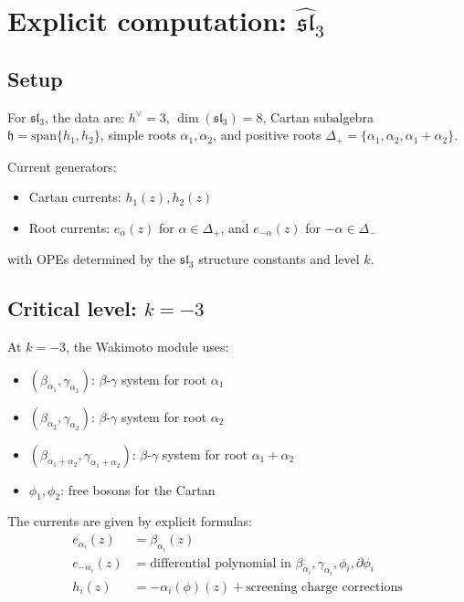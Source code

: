 \section{\texorpdfstring{Explicit computation: $\widehat{\mathfrak{sl}}_3$}{Explicit computation: sl-3}}
\label{sec:sl3-computation}

\subsection{Setup}

For $\mathfrak{sl}_3$, the data are: $h^\vee = 3$, $\dim(\mathfrak{sl}_3) = 8$, Cartan subalgebra $\mathfrak{h} = \mathrm{span}\{h_1, h_2\}$, simple roots $\alpha_1, \alpha_2$, and positive roots $\Delta_+ = \{\alpha_1, \alpha_2, \alpha_1+\alpha_2\}$.

\begin{definition}
Current generators:
\begin{itemize}
\item Cartan currents: $h_1(z), h_2(z)$
\item Root currents: $e_{\alpha}(z)$ for $\alpha \in \Delta_+$, and $e_{-\alpha}(z)$ for $-\alpha \in \Delta_-$
\end{itemize}
with OPEs determined by the $\mathfrak{sl}_3$ structure constants and level $k$.
\end{definition}

\subsection{\texorpdfstring{Critical level: $k = -3$}{Critical level: k = -3}}

\begin{theorem}\label{thm:w3-wakimoto-sl3}
At $k = -3$, the Wakimoto module uses:
\begin{itemize}
\item $(\beta_{\alpha_1}, \gamma_{\alpha_1})$: $\beta$-$\gamma$ system for root $\alpha_1$
\item $(\beta_{\alpha_2}, \gamma_{\alpha_2})$: $\beta$-$\gamma$ system for root $\alpha_2$
\item $(\beta_{\alpha_1+\alpha_2}, \gamma_{\alpha_1+\alpha_2})$: $\beta$-$\gamma$ system for root $\alpha_1+\alpha_2$
\item $\phi_1, \phi_2$: free bosons for the Cartan
\end{itemize}

The currents are given by explicit formulas:
\begin{align}
e_{\alpha_i}(z) &= \beta_{\alpha_i}(z) \\
e_{-\alpha_i}(z) &= \text{differential polynomial in } \beta_{\alpha_i}, \gamma_{\alpha_i}, \phi_i, \partial\phi_i \\
h_i(z) &= -\alpha_i(\phi)(z) + \text{screening charge corrections}
\end{align}
\end{theorem}

